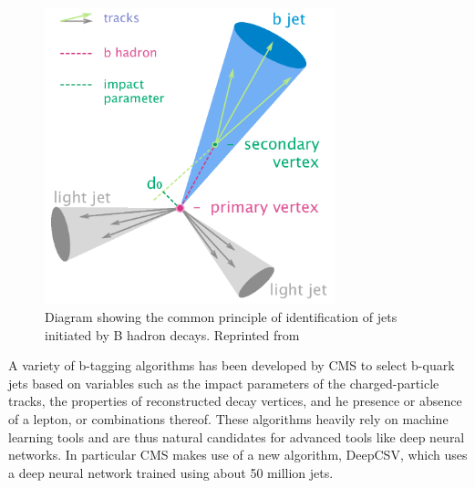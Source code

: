 \begin{figure}[h]
  	\label{fig:antikt}
 	\centering
 	\includegraphics[width=0.75\textwidth]{figures/Btag.png}
 	\singlespace
 	\caption{Diagram showing the common principle of identification of jets initiated by B hadron decays. Reprinted from \cite{wiki:btag}}
 \end{figure}

A variety of b-tagging algorithms has been developed by CMS to select b-quark jets\cite{BTV-12-001} based on variables such as the impact parameters of the charged-particle tracks, the properties of reconstructed decay vertices, and he presence or absence of a lepton, or combinations thereof. These algorithms heavily rely on machine learning tools and are thus natural candidates for advanced tools like deep neural networks. In particular CMS makes use of a new algorithm, DeepCSV\cite{Sirunyan_2018, PhysRevD.94.112002}, which uses a deep neural network trained using about 50 million jets. 


